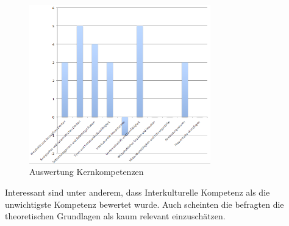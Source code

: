 \begin{figure}[ht]
	\centering
	\includegraphics[width=0.7\textwidth]{images/Auswertung_kernkompetenzen.png}
	\caption{Auswertung Kernkompetenzen}
	\label{fig:auswerkomp}
\end{figure}


Interessant sind unter anderem, dass Interkulturelle Kompetenz als die unwichtigste Kompetenz bewertet wurde. Auch scheinten die befragten die theoretischen Grundlagen als kaum relevant einzuschätzen.

